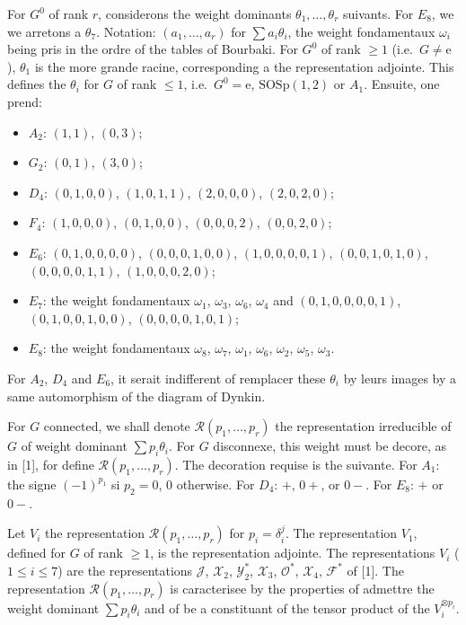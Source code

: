 \documentclass[11pt,a4paper]{article}
\theoremstyle{plain}
\theoremstyle{definition}
\begin{document}
For $G^0$ of rank $r$, considerons the weight dominants $\theta_1,\dots,\theta_r$ suivants. For $E_8$, we we arretons a $\theta_7$. Notation: $(a_1,\dots,a_r)$ for $\sum a_i \theta_i$, the weight fondamentaux $\omega_i$ being pris in the ordre of the tables of Bourbaki. For $G^0$ of rank $\geq 1$ (i.e.\ $G \not= \text{e}$), $\theta_1$ is the more grande racine, corresponding a the representation adjointe. This defines the $\theta_i$ for $G$ of rank $\leq 1$, i.e.\ $G^0 = \text{e}$, $\mathrm{SOSp}(1,2)$ or $A_1$. Ensuite, one prend:
\begin{itemize}[leftmargin=2em]
\item[] $A_2$: $(1,1)$, $(0,3)$;
\item[] $G_2$: $(0,1)$, $(3,0)$;
\item[] $D_4$: $(0,1,0,0)$, $(1,0,1,1)$, $(2,0,0,0)$, $(2,0,2,0)$;
\item[] $F_4$: $(1,0,0,0)$, $(0,1,0,0)$, $(0,0,0,2)$, $(0,0,2,0)$;
\item[] $E_6$: $(0,1,0,0,0,0)$, $(0,0,0,1,0,0)$, $(1,0,0,0,0,1)$, $(0,0,1,0,1,0)$, $(0,0,0,0,1,1)$, $(1,0,0,0,2,0)$;
\item[] $E_7$: the weight fondamentaux $\omega_1$, $\omega_3$, $\omega_6$, $\omega_4$ and $(0,1,0,0,0,0,1)$, $(0,1,0,0,1,0,0)$, $(0,0,0,0,1,0,1)$;
\item[] $E_8$: the weight fondamentaux $\omega_8$, $\omega_7$, $\omega_1$, $\omega_6$, $\omega_2$, $\omega_5$, $\omega_3$.
\end{itemize}
For $A_2$, $D_4$ and $E_6$, it serait indifferent of remplacer these $\theta_i$ by leurs images by a same automorphism of the diagram of Dynkin.

For $G$ connected, we shall denote $\mathcal{R}(p_1,\dots,p_r)$ the representation irreducible of $G$ of weight dominant $\sum p_i \theta_i$. For $G$ disconnexe, this weight must be decore, as in [1], for define $\mathcal{R}(p_1,\dots,p_r)$. The decoration requise is the suivante. For $A_1$: the signe $(-1)^{p_1}$ si $p_2 = 0$, $0$ otherwise. For $D_4$: $+$, $0+$, or $0-$. For $E_8$: $+$ or $0-$.

Let $V_i$ the representation $\mathcal{R}(p_1,\dots,p_r)$ for $p_i = \delta_i^j$. The representation $V_1$, defined for $G$ of rank $\geq 1$, is the representation adjointe. The representations $V_i$ ($1 \leq i \leq 7$) are the representations $\mathcal{J}$, $\mathcal{X}_2$, $\mathcal{Y}_2^*$, $\mathcal{X}_3$, $\mathcal{O}^*$, $\mathcal{X}_4$, $\mathcal{F}^*$ of [1]. The representation $\mathcal{R}(p_1,\dots,p_r)$ is caracterisee by the properties of admettre the weight dominant $\sum p_i \theta_i$ and of be a constituant of the tensor product of the $V_i^{\otimes p_i}$.
\end{document}
